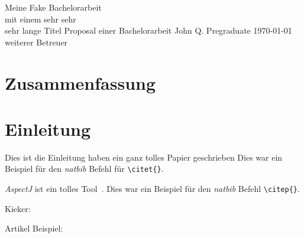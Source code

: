 

\usepackage{pgfgantt}

\usepackage{rotating}

\hypersetup{pdftitle=Meine Fake Bachelorarbeit mit einem sehr sehr sehr lange Titel}
\hypersetup{pdfauthor=John Q. Pregraduate}
\hypersetup{pdfsubject=Proposal einer Bachelorarbeit}
\hypersetup{pdfkeywords=}


\frontmatter
  \thesistitlepage
    {Meine Fake Bachelorarbeit \\[.1em]mit einem sehr sehr \\[.1em]sehr lange Titel}%
    {Proposal einer Bachelorarbeit}%
    {John Q. Pregraduate}%
    {\today}%
    {weiterer Betreuer} %

  \eidesstatt{}

  \chapter*{Zusammenfassung}
    \blindtext

  \tableofcontents{}

\mainmatter


\chapter{Einleitung}
  Dies ist die Einleitung
  \citet{Shaw2003} haben ein ganz tolles Papier geschrieben
  Dies war ein Beispiel für den \textit{natbib} Befehl für \texttt{\textbackslash{}citet\{\}}.
  
  \textit{AspectJ} ist ein tolles Tool~\citep{AspectJ}. Dies war ein Beispiel für den \textit{natbib} Befehl \texttt{\textbackslash{}citep\{\}}.
  
  Kieker: \citep{Rohr2008, Hoorn2009, Hoorn2012}
  
  Artikel Beispiel: \citep{Frey2011}
  
